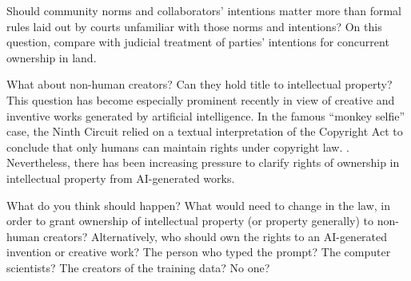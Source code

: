 Should community norms and collaborators' intentions matter more than formal
rules laid out by courts unfamiliar with those norms and intentions? On this
question, compare with judicial treatment of parties' intentions for concurrent
ownership in land.



\item What about non-human creators? Can they hold title to intellectual
property? This question has become especially prominent recently in view of
creative and inventive works generated by artificial intelligence. In the famous
``monkey selfie'' case, the Ninth Circuit relied on a textual interpretation of
the Copyright Act to conclude that only humans can maintain rights under
copyright law. . Nevertheless, there has
been increasing pressure to clarify rights of ownership in intellectual
property from AI-generated works.

What do you think should happen? What would need to change in the law, in order
to grant ownership of intellectual property (or property generally) to non-human
creators? Alternatively, who should own the rights to an AI-generated invention
or creative work? The person who typed the prompt? The computer scientists? The
creators of the training data? No one?


